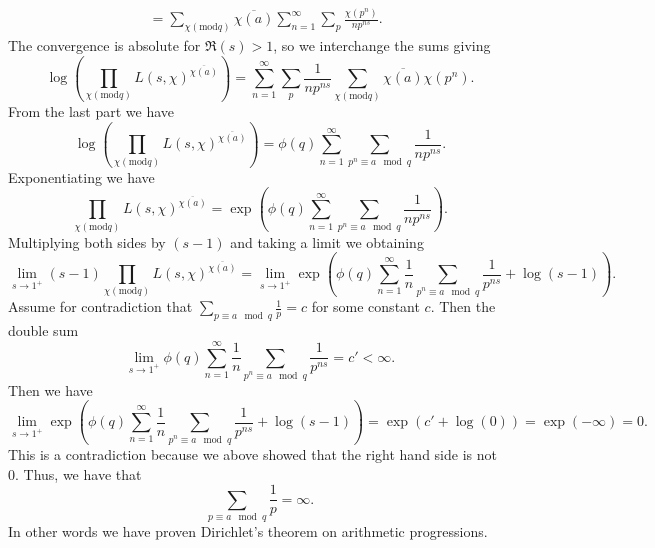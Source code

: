 \documentclass[12pt]{article}
\begin{document}
\begin{enumerate}[label=(\alph*)]
\begin{align*}
        &=\sum_{\chi(\text{mod} q)}\overline{\chi(a)}\sum_{n=1}^{\infty}\sum_{p}\frac{\chi(p^n)}{np^{ns}}.
    \end{align*}
    The convergence is absolute for $\Re(s)>1$, so we interchange the sums giving
    \[
        \log\left(\prod_{\chi(\text{mod} q)}L(s,\chi)^{\overline{\chi(a)}}\right)=\sum_{n=1}^{\infty}\sum_{p}\frac{1}{np^{ns}}\sum_{\chi(\text{mod} q)}\overline{\chi(a)}\chi(p^n).
    \]
    From the last part we have
    \[
        \log\left(\prod_{\chi(\text{mod} q)}L(s,\chi)^{\overline{\chi(a)}}\right)=\phi(q)\sum_{n=1}^{\infty}\sum_{p^n\equiv a\mod q}\frac{1}{np^{ns}}.    
    \]
    Exponentiating we have
    \[
        \prod_{\chi(\text{mod} q)}L(s,\chi)^{\overline{\chi(a)}}=\exp\left(\phi(q)\sum_{n=1}^{\infty}\sum_{p^n\equiv a\mod q}\frac{1}{np^{ns}}\right).
    \]
    Multiplying both sides by $(s-1)$ and taking a limit we obtaining
    \[
        \lim_{s\to1^{+}}(s-1)\prod_{\chi(\text{mod} q)}L(s,\chi)^{\overline{\chi(a)}}=\lim_{s\to1^{+}}\exp\left(\phi(q)\sum_{n=1}^{\infty}\frac{1}{n}\sum_{p^n\equiv a\mod q}\frac{1}{p^{ns}}+\log(s-1)\right).
    \]    
    Assume for contradiction that $\sum_{p\equiv a\mod q}\frac{1}{p}=c$ for some constant $c$. Then the double sum
    \[
        \lim_{s\to1^{+}}\phi(q)\sum_{n=1}^{\infty}\frac{1}{n}\sum_{p^n\equiv a\mod q}\frac{1}{p^{ns}}=c'<\infty.
    \]
    Then we have
    \[
        \lim_{s\to1^{+}}\exp\left(\phi(q)\sum_{n=1}^{\infty}\frac{1}{n}\sum_{p^n\equiv a\mod q}\frac{1}{p^{ns}}+\log(s-1)\right)=\exp(c'+\log(0))=\exp(-\infty)=0.
    \]
    This is a contradiction because we above showed that the right hand side is not 0. Thus, we have that
    \[
        \sum_{p\equiv a\mod q}\frac{1}{p}=\infty.
    \]
    In other words we have proven Dirichlet's theorem on arithmetic progressions.
\end{enumerate}

\end{document}
